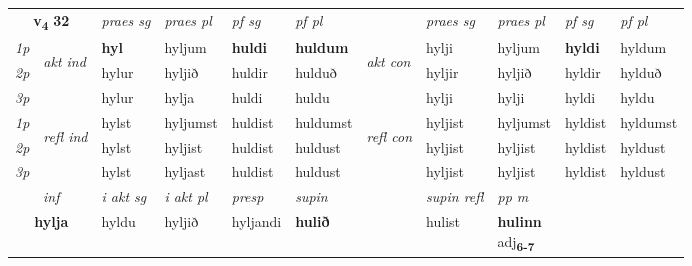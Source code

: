 \noindent
\begin{tabular}{lllllllllll} \toprule
\multicolumn{2}{c}{\textbf{v{\textsubscript{4}}} \Large{\textbf{32}}}  &  \textit{praes sg}  & \textit{praes pl}  &\textit{ pf sg} & \textit{pf pl} &  &  \textit{praes sg}  & \textit{praes pl}  & \textit{pf sg} & \textit{pf pl } \\*
	\cmidrule{3-6} \cmidrule{8-11}
 {\textit{1p}} & \multirow{3}{*}{\begin{turn}{90}\textit{akt ind}\end{turn}} & \textbf{hyl} & hyljum & \textbf{huldi} & \textbf{huldum} & \multirow{3}{*}{\begin{turn}{90}\textit{akt con}\end{turn}} &hylji & hyljum & \textbf{hyldi} & hyldum\\*
 {\textit{2p}} &  &  hylur  & hyljið & huldir & hulduð & & hyljir & hyljið & hyldir & hylduð \\*
{\textit{3p}} &  & hylur & hylja & huldi & huldu & & hylji & hylji& hyldi & hyldu \\*
\cmidrule{3-6} \cmidrule{8-11}
 {\textit{1p}} & \multirow{3}{*}{\begin{turn}{90}\textit{refl ind}\end{turn}}  & hylst & hyljumst & huldist & huldumst & \multirow{3}{*}{\begin{turn}{90}\textit{refl con}\end{turn}}  &hyljist & hyljumst & hyldist & hyldumst \\*
 {\textit{2p}} &  & hylst & hyljist & huldist & huldust & &hyljist & hyljist & hyldist & hyldust \\*
 {\textit{3p}}  & & hylst & hyljast & huldist & huldust & & hyljist & hyljist& hyldist & hyldust \\*
\cmidrule{3-6} \cmidrule{8-11}

   \multicolumn{2}{c}{\textit{inf}}  & \textit{i akt sg} & \textit{i akt pl}   & \textit{presp} & \textit{supin} && \textit{supin refl} & \textit{pp m} \\*
  \multicolumn{2}{c}{\textbf{hylja}} & hyldu  & hyljið   & hyljandi &  \textbf{hulið} && hulist & \specialcell{\textbf{hulinn} \\ adj\textbf{\textsubscript{6-7}}} \\*
\end{tabular}

